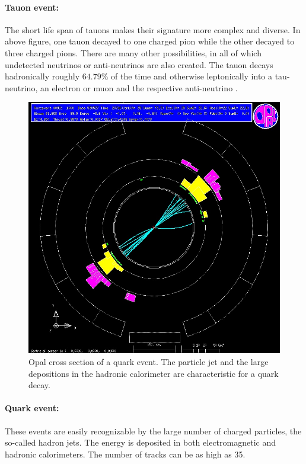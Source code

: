 \paragraph{Tauon event:} The short life span of tauons makes their signature more complex and diverse. In above figure, one tauon decayed to one charged pion while the other decayed to three charged pions. There are many other possibilities, in all of which undetected neutrinos or anti-neutrinos are also created. The tauon decays hadronically roughly $64.79\%$ of the time and otherwise leptonically into a tau-neutrino, an electron or muon and the respective anti-neutrino \cite{taudata}.

\newpage
\begin{figure}[H]
\centering
\includegraphics[width=0.75\linewidth]{graphics/quarkopal}
\caption[OPAL cross section quark event]{Opal cross section of a quark event. The particle jet and the large depositions in the hadronic calorimeter are characteristic for a quark decay. \cite{cern}}
\label{fig:quarkopal}
\end{figure}
\paragraph{Quark event:} These events are easily recognizable by the large number of charged particles, the so-called hadron jets. The energy is deposited in both electromagnetic and hadronic calorimeters. The number of tracks can be as high as 35.
\newpage


